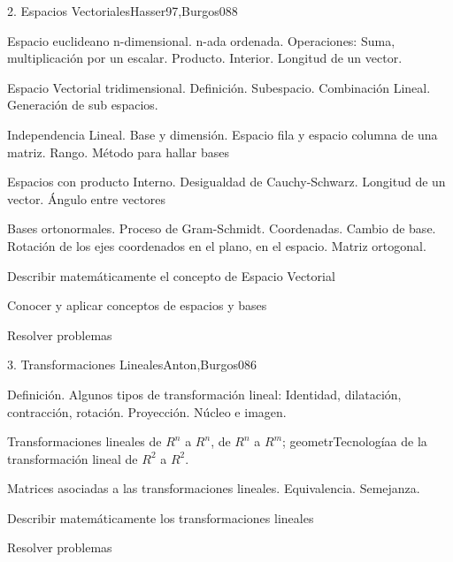 \begin{syllabus}
\begin{unit}{2. Espacios Vectoriales}{Hasser97,Burgos08}{8}
\begin{topics}
	\item Espacio euclideano n-dimensional. n-ada ordenada. Operaciones: Suma, multiplicación por un escalar. Producto. Interior. Longitud de un vector.
	\item Espacio Vectorial tridimensional. Definición. Subespacio. Combinación Lineal. Generación de sub espacios.
      \item Independencia Lineal. Base y dimensión. Espacio fila y espacio columna de una matriz. Rango. Método para hallar bases
      \item Espacios con producto Interno. Desigualdad de Cauchy-Schwarz. Longitud de un vector. Ángulo entre vectores
      \item Bases ortonormales. Proceso de Gram-Schmidt. Coordenadas. Cambio de base. Rotación de los ejes coordenados en el plano, en el espacio. Matriz ortogonal.
    \end{topics}
   \begin{unitgoals}
      \item Describir matemáticamente el concepto de Espacio Vectorial
      \item Conocer y aplicar conceptos de espacios y bases
	\item Resolver problemas
   \end{unitgoals}
\end{unit}

\begin{unit}{3. Transformaciones Lineales}{Anton,Burgos08}{6}
\begin{topics}
      \item Definición. Algunos tipos de transformación lineal: Identidad, dilatación, contracción, rotación. Proyección. Núcleo e imagen.
      \item Transformaciones lineales de $R^n$ a $R^n$, de $R^n$ a $R^m$; geometrTecnologíaa de la transformación lineal de $R^2$ a $R^2$.
      \item Matrices asociadas a las transformaciones lineales. Equivalencia. Semejanza.
\end{topics}

   \begin{unitgoals}
      \item Describir matemáticamente los transformaciones lineales
	\item Resolver problemas
   \end{unitgoals}
\end{unit}


\end{syllabus}
